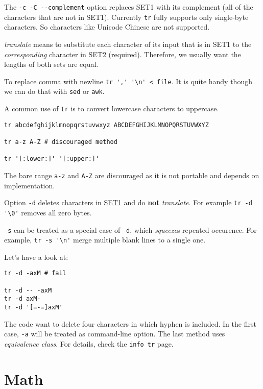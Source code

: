 The \lstinline|-c -C --complement| option replaces SET1 with its
complement (all of the characters that are not in SET1). Currently
\lstinline|tr| fully supports only single-byte characters. So
characters like Unicode Chinese are not supported.

\textit{translate} means to substitute each character of its input
that is in SET1 to the \textit{corresponding} character in SET2
(required). Therefore, we usually want the lengths of both sets
are equal.

To replace comma with newline \lstinline|tr ',' '\n' < file|. It
is quite handy though we can do that with \lstinline|sed| or
\lstinline|awk|.

A common use of \lstinline|tr| is to convert lowercase characters to
uppercase.

\begin{lstlisting}
tr abcdefghijklmnopqrstuvwxyz ABCDEFGHIJKLMNOPQRSTUVWXYZ

tr a-z A-Z # discouraged method

tr '[:lower:]' '[:upper:]'
\end{lstlisting}

The bare range \verb|a-z| and \verb|A-Z| are discouraged as it is
not portable and depends on implementation.

Option \lstinline|-d| deletes characters in \uline{SET1} and do
\textbf{not} \textit{translate}. For example
\lstinline|tr -d '\0'| removes all zero bytes.

\lstinline|-s| can be treated as a special case of \lstinline|-d|,
which \textit{squeeze}s repeated occurence. For example,
\lstinline|tr -s '\n'| merge multiple blank lines to a single one.

Let's have a look at:

\begin{lstlisting}
tr -d -axM # fail

tr -d -- -axM
tr -d axM-
tr -d '[=-=]axM'
\end{lstlisting}

The code want to delete four characters in which hyphen is
included. In the first case, \lstinline|-a| will be treated as
command-line option. The last method uses \textit{equivalence
  class}. For details, check the \lstinline|info tr| page.

\section{Math}
\label{sec:bash-math}

